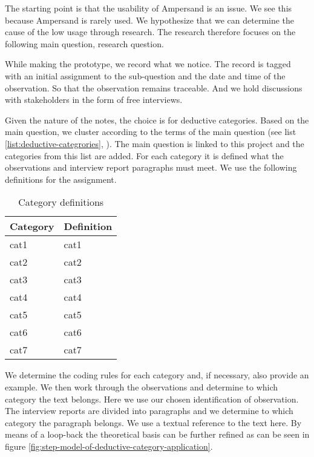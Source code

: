 The starting point is that the usability of Ampersand is an issue.
We see this because Ampersand is rarely used.
We hypothesize that we can determine the cause of the low usage through research.
The research therefore focuses on the following main question, \acrlong{research question}.

While making the prototype, we record what we notice.
The record is tagged with an initial assignment to the sub-question and the date and time of the observation.
So that the observation remains traceable.
And we hold discussions with stakeholders in the form of free interviews.

Given the nature of the notes, the choice is for deductive categories\citep{mayring_qualitative_2019}.
Based on the main question, we cluster according to the terms of the main question (see list \ref{list:deductive-categrories}, ).
The main question is linked to this project and the categories from this list are added.
For each category it is defined what the observations and interview report paragraphs must meet.
We use the following definitions for the assignment.
\begin{table}[H]
    \begin{tabularx}{\linewidth}{|X|X|}
    \hline
        \textbf{Category} & \textbf{Definition} \\\hline
        \acrshort{cat1} & \acrlong{cat1} \\\hline
        \acrshort{cat2} & \acrlong{cat2} \\\hline
        \acrshort{cat3} & \acrlong{cat3} \\\hline
        \acrshort{cat4} & \acrlong{cat4} \\\hline
        \acrshort{cat5} & \acrlong{cat5} \\\hline
        \acrshort{cat6} & \acrlong{cat6} \\\hline
        \acrshort{cat7} & \acrlong{cat7} \\\hline
    \end{tabularx}
    \caption{Category definitions}
    \label{tab:Category definitions}
\end{table}

We determine the coding rules for each category and, if necessary, also provide an example.
We then work through the observations and determine to which category the text belongs.
Here we use our chosen identification of observation.
The interview reports are divided into paragraphs and we determine to which category the paragraph belongs.
We use a textual reference to the text here.
By means of a loop-back the theoretical basis can be further refined as can be seen in figure \ref{fig:step-model-of-deductive-category-application}.


